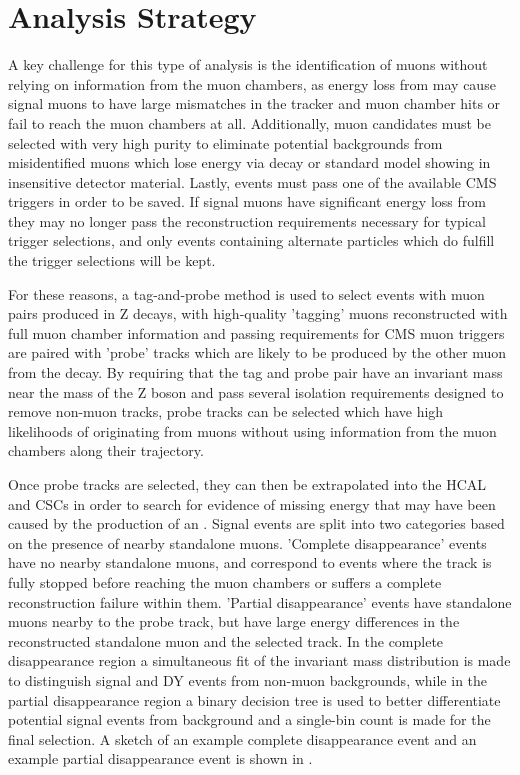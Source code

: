 \chapter{Analysis Strategy}
\label{analysis}
A key challenge for this type of analysis is the identification of muons without relying on information from the muon chambers, as energy loss from \dbrem may cause signal muons to have large mismatches in the tracker and muon chamber hits or fail to reach the muon chambers at all.
Additionally, muon candidates must be selected with very high purity to eliminate potential backgrounds from misidentified muons which lose energy via decay or standard model showing in insensitive detector material.
Lastly, events must pass one of the available CMS triggers in order to be saved.
If signal muons have significant energy loss from \dbrem they may no longer pass the reconstruction requirements necessary for typical trigger selections, and only events containing alternate particles which do fulfill the trigger selections will be kept.

For these reasons, a tag-and-probe method is used to select events with muon pairs produced in Z decays, with high-quality 'tagging' muons reconstructed with full muon chamber information and passing requirements for CMS muon triggers are paired with 'probe' tracks which are likely to be produced by the other muon from the decay.
By requiring that the tag and probe pair have an invariant mass near the mass of the Z boson and pass several isolation requirements designed to remove non-muon tracks, probe tracks can be selected which have high likelihoods of originating from muons without using information from the muon chambers along their trajectory.

Once probe tracks are selected, they can then be extrapolated into the HCAL and CSCs in order to search for evidence of missing energy that may have been caused by the production of an \aprime.
Signal events are split into two categories based on the presence of nearby standalone muons.
'Complete disappearance' events have no nearby standalone muons, and correspond to events where the track is fully stopped before reaching the muon chambers or suffers a complete reconstruction failure within them.
'Partial disappearance' events have standalone muons nearby to the probe track, but have large energy differences in the reconstructed standalone muon and the selected track.
In the complete disappearance region a simultaneous fit of the invariant mass distribution is made to distinguish signal and DY events from non-muon backgrounds, while in the partial disappearance region a binary decision tree is used to better differentiate potential signal events from background and a single-bin count is made for the final selection.
A sketch of an example complete disappearance event and an example partial disappearance event is shown in .

